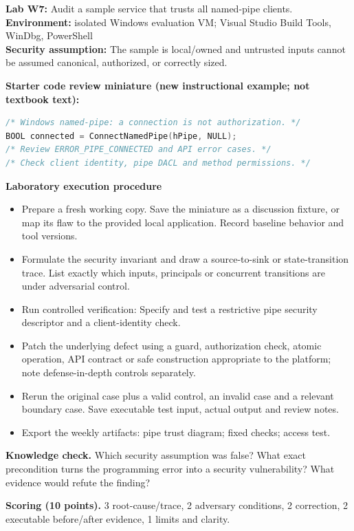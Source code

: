 \documentclass[10pt,letterpaper]{article}
\begin{document}
\begin{insight}\textbf{Lab W7:} Audit a sample service that trusts all named-pipe clients.\\\textbf{Environment:} isolated Windows evaluation VM; Visual Studio Build Tools, WinDbg, PowerShell\\\textbf{Security assumption:} The sample is local/owned and untrusted inputs cannot be assumed canonical, authorized, or correctly sized.\end{insight}
\textbf{Starter code review miniature (new instructional example; not textbook text):}
\begin{lstlisting}[language=C]
/* Windows named-pipe: a connection is not authorization. */
BOOL connected = ConnectNamedPipe(hPipe, NULL);
/* Review ERROR_PIPE_CONNECTED and API error cases. */
/* Check client identity, pipe DACL and method permissions. */
\end{lstlisting}
\textbf{Laboratory execution procedure}
\begin{itemize}[leftmargin=*,itemsep=2pt]
\item Prepare a fresh working copy. Save the miniature as a discussion fixture, or map its flaw to the provided local application. Record baseline behavior and tool versions.
\item Formulate the security invariant and draw a source-to-sink or state-transition trace. List exactly which inputs, principals or concurrent transitions are under adversarial control.
\item Run controlled verification: Specify and test a restrictive pipe security descriptor and a client-identity check.
\item Patch the underlying defect using a guard, authorization check, atomic operation, API contract or safe construction appropriate to the platform; note defense-in-depth controls separately.
\item Rerun the original case plus a valid control, an invalid case and a relevant boundary case. Save executable test input, actual output and review notes.
\item Export the weekly artifacts: pipe trust diagram; fixed checks; access test.
\end{itemize}
\textbf{Knowledge check.} Which security assumption was false? What exact precondition turns the programming error into a security vulnerability? What evidence would refute the finding?

\textbf{Scoring (10 points).} 3 root-cause/trace, 2 adversary conditions, 2 correction, 2 executable before/after evidence, 1 limits and clarity.
\end{document}
